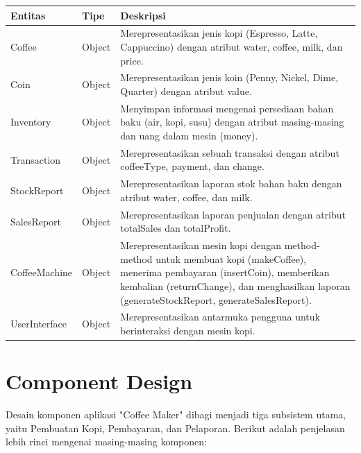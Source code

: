 \documentclass[12pt]{article}
\begin{document}
\begin{tabular}{|l|l|p{10cm}|}
\hline
\textbf{Entitas} & \textbf{Tipe} & \textbf{Deskripsi} \\
\hline
Coffee & Object & Merepresentasikan jenis kopi (Espresso, Latte, Cappuccino) dengan atribut water, coffee, milk, dan price. \\
\hline
Coin & Object & Merepresentasikan jenis koin (Penny, Nickel, Dime, Quarter) dengan atribut value. \\
\hline
Inventory & Object & Menyimpan informasi mengenai persediaan bahan baku (air, kopi, susu) dengan atribut masing-masing dan uang dalam mesin (money). \\
\hline
Transaction & Object & Merepresentasikan sebuah transaksi dengan atribut coffeeType, payment, dan change. \\
\hline
StockReport & Object & Merepresentasikan laporan stok bahan baku dengan atribut water, coffee, dan milk. \\
\hline
SalesReport & Object & Merepresentasikan laporan penjualan dengan atribut totalSales dan totalProfit. \\
\hline
CoffeeMachine & Object & Merepresentasikan mesin kopi dengan method-method untuk membuat kopi (makeCoffee), menerima pembayaran (insertCoin), memberikan kembalian (returnChange), dan menghasilkan laporan (generateStockReport, generateSalesReport). \\
\hline
UserInterface & Object & Merepresentasikan antarmuka pengguna untuk berinteraksi dengan mesin kopi. \\
\hline
\end{tabular}

\section{Component Design}
Desain komponen aplikasi "Coffee Maker" dibagi menjadi tiga subsistem utama, yaitu Pembuatan Kopi, Pembayaran, dan Pelaporan. Berikut adalah penjelasan lebih rinci mengenai masing-masing komponen:
\end{document}
